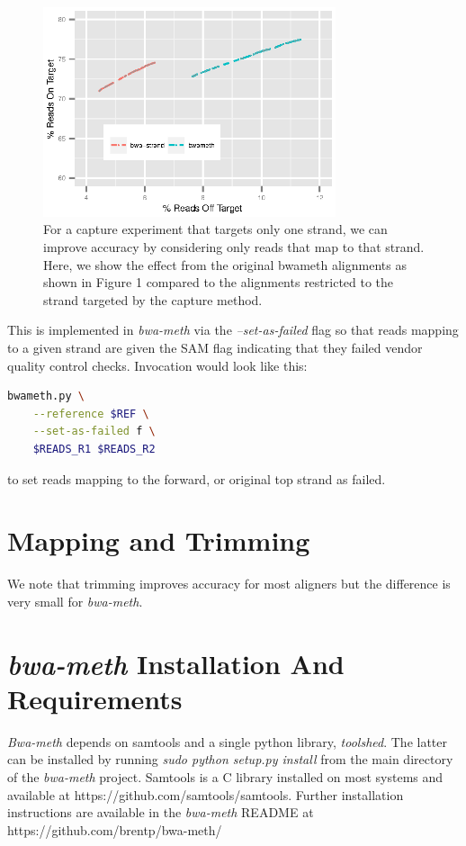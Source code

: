 \documentclass[12pt]{article}
\begin{document}
\begin{figure}[H]%
    \centerline{\includegraphics[width=86mm]{real-bwa-strand.eps}}
    \caption{For a capture experiment that targets only one strand, we can
    improve accuracy by considering only reads that map to that strand.
    Here, we show the effect from the original bwameth alignments as shown
    in Figure 1 compared to the alignments restricted to the strand targeted
    by the capture method.}\label{suppfig:07}
\end{figure}

This is implemented in \textit{bwa-meth} via the \emph{--set-as-failed}
flag so that reads mapping to a given strand are given the SAM flag
indicating that they failed vendor quality control checks. Invocation
would look like this:

\begin{lstlisting}[language=bash]
bwameth.py \
    --reference $REF \
    --set-as-failed f \
    $READS_R1 $READS_R2

\end{lstlisting}
to set reads mapping to the forward, or original top strand
as failed.


\section{Mapping and Trimming}
We note that trimming improves accuracy for most aligners but the
difference is very small for \textit{bwa-meth}.

\section{\textit{bwa-meth} Installation And Requirements}

\textit{Bwa-meth} depends on samtools and a single python library, \textit{toolshed}.
The latter can be installed by running \emph{sudo python setup.py install} from the main
directory of the \textit{bwa-meth} project. Samtools is a C library installed on most
systems and available at https://github.com/samtools/samtools.
Further installation instructions are available in the \textit{bwa-meth} README at
https://github.com/brentp/bwa-meth/
\end{document}
